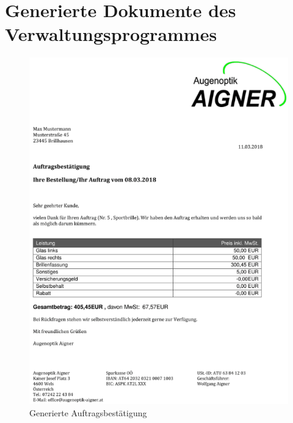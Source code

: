 \chapter{Generierte Dokumente des Verwaltungsprogrammes}
\begin{figure}
\begin{center}
	\includegraphics[scale=0.9]{images/MusterAuftragsbestaetigung.png}
\end{center}
	\caption{Generierte Auftragsbest\"atigung}
	\label{fig:sample}
\end{figure}
\newpage
